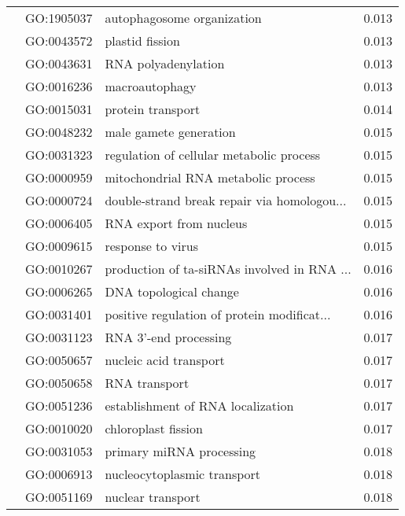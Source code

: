 \begin{longtable}{lllr}
   & GO:1905037 &                   autophagosome organization &         0.013 \\
   & GO:0043572 &                              plastid fission &         0.013 \\
   & GO:0043631 &                          RNA polyadenylation &         0.013 \\
   & GO:0016236 &                               macroautophagy &         0.013 \\
   & GO:0015031 &                            protein transport &         0.014 \\
   & GO:0048232 &                       male gamete generation &         0.015 \\
   & GO:0031323 &     regulation of cellular metabolic process &         0.015 \\
   & GO:0000959 &          mitochondrial RNA metabolic process &         0.015 \\
   & GO:0000724 &  double-strand break repair via homologou... &         0.015 \\
   & GO:0006405 &                      RNA export from nucleus &         0.015 \\
   & GO:0009615 &                            response to virus &         0.015 \\
   & GO:0010267 &  production of ta-siRNAs involved in RNA ... &         0.016 \\
   & GO:0006265 &                       DNA topological change &         0.016 \\
   & GO:0031401 &  positive regulation of protein modificat... &         0.016 \\
   & GO:0031123 &                        RNA 3'-end processing &         0.017 \\
   & GO:0050657 &                       nucleic acid transport &         0.017 \\
   & GO:0050658 &                                RNA transport &         0.017 \\
   & GO:0051236 &            establishment of RNA localization &         0.017 \\
   & GO:0010020 &                          chloroplast fission &         0.017 \\
   & GO:0031053 &                     primary miRNA processing &         0.018 \\
   & GO:0006913 &                  nucleocytoplasmic transport &         0.018 \\
   & GO:0051169 &                            nuclear transport &         0.018 \\

\end{longtable}
